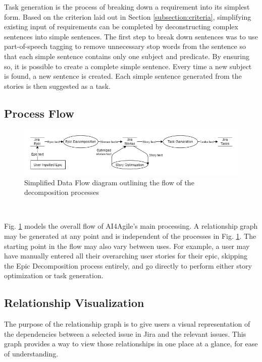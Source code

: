 Task generation is the process of breaking down a requirement into its simplest form. Based on the criterion laid out in Section \ref{subsection:criteria}, simplifying existing input of requirements can be completed by deconstructing complex sentences into simple sentences. 
The first step to break down sentences was to use part-of-speech tagging to remove unnecessary stop words from the sentence so that each simple sentence contains only one subject and predicate. By ensuring so, it is possible to create a complete simple sentence. Every time a new subject is found, a new sentence is created. Each simple sentence generated from the stories is then suggested as a task.

\subsection{Process Flow}

\begin{figure}
\centering
\includegraphics[width=\textwidth,keepaspectratio]{./figure/ExampleDataFlowDiagram.png}
\caption{Simplified Data Flow diagram outlining the flow of the decomposition processes}
\label{fig:ExampleDataFlowDiagram}
\end{figure}\

Fig. \ref{fig:ExampleDataFlowDiagram} models the overall flow of AI4Agile’s main processing. A relationship graph may be generated at any point and is independent of the processes in Fig. \ref{fig:ExampleDataFlowDiagram}.  The starting point in the flow may also vary between uses. For example, a user may have manually entered all their overarching user stories for their epic, skipping the Epic Decomposition process entirely, and go directly to perform either story optimization or task generation.

\subsection{Relationship Visualization}
The purpose of the relationship graph is to give users a visual representation of the dependencies between a selected issue in Jira and the relevant issues. This graph provides a way to view those relationships in one place at a glance, for ease of understanding.

